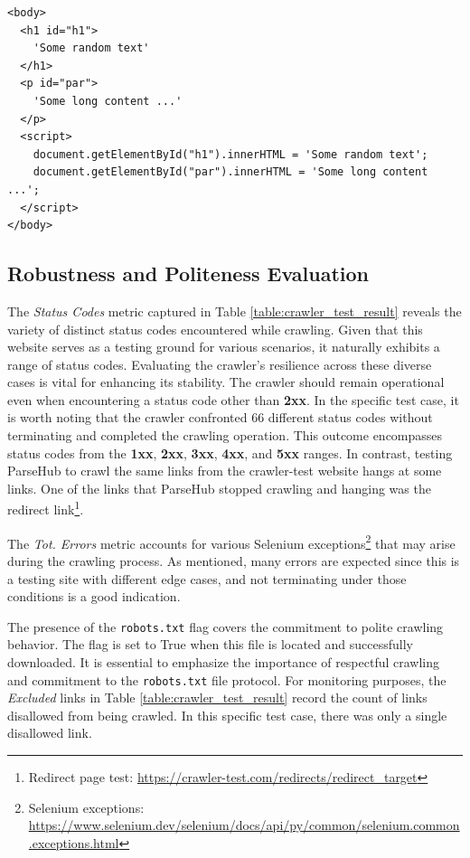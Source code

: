 {\lstset{language=HTML}
{\footnotesize
\begin{lstlisting}[frame=single, caption={The dynamically-inserted-text link content after rendering.},captionpos=b, label={lst:rendered}]
<body>
  <h1 id="h1">
    'Some random text'
  </h1> 
  <p id="par">
    'Some long content ...'
  </p>
  <script>
    document.getElementById("h1").innerHTML = 'Some random text';
    document.getElementById("par").innerHTML = 'Some long content ...'; 
  </script>
</body>
\end{lstlisting}}

\subsection*{Robustness and Politeness Evaluation}
The \textit{Status Codes} metric captured in Table \ref{table:crawler_test_result} reveals the variety of distinct status codes encountered while crawling. Given that this website serves as a testing ground for various scenarios, it naturally exhibits a range of status codes. Evaluating the crawler's resilience across these diverse cases is vital for enhancing its stability. The crawler should remain operational even when encountering a status code other than \textbf{2xx}.
In the specific test case, it is worth noting that the crawler confronted 66 different status codes without terminating and completed the crawling operation. This outcome encompasses status codes from the \textbf{1xx}, \textbf{2xx}, \textbf{3xx}, \textbf{4xx}, and \textbf{5xx} ranges. In contrast, testing ParseHub to crawl the same links from the crawler-test website hangs at some links. One of the links that ParseHub stopped crawling and hanging was the redirect link\footnote{Redirect page test: \url{https://crawler-test.com/redirects/redirect_target}}.

The \textit{Tot. Errors} metric accounts for various Selenium exceptions\footnote{Selenium exceptions:  \url{https://www.selenium.dev/selenium/docs/api/py/common/selenium.common.exceptions.html}} that may arise during the crawling process. As mentioned, many errors are expected since this is a testing site with different edge cases, and not terminating under those conditions is a good indication.

The presence of the \texttt{robots.txt} flag covers the commitment to polite crawling behavior. The flag is set to True when this file is located and successfully downloaded. It is essential to emphasize the importance of respectful crawling and commitment to the \texttt{robots.txt} file protocol. For monitoring purposes, the \textit{Excluded} links in Table \ref{table:crawler_test_result} record the count of links disallowed from being crawled. In this specific test case, there was only a single disallowed link. 

}
